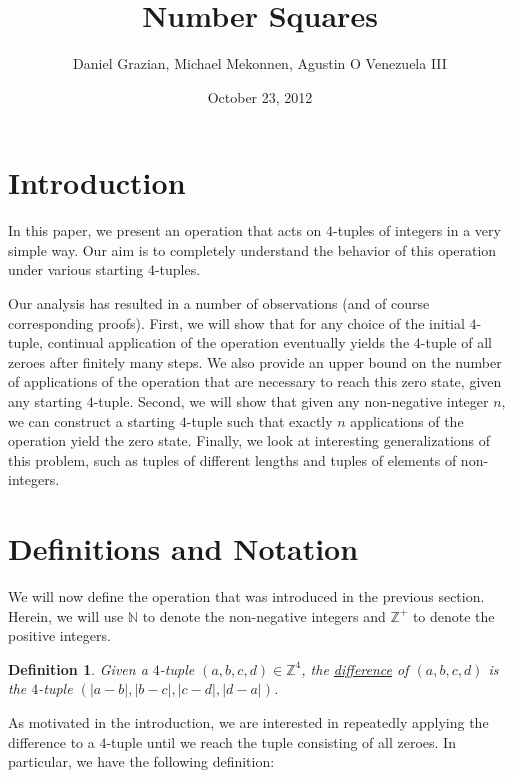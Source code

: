 \documentclass[12pt]{amsart}
\title{Number Squares}
\author{Daniel Grazian, Michael Mekonnen, Agustin O Venezuela III}
\date{October 23, 2012}
\newtheorem{definition}[theorem]{Definition}
\newcommand{\znn}{\mathbb{N}}
\newcommand{\zp}{\mathbb{Z}^+}
\begin{document}
\begin{abstract}
\end{abstract}

\maketitle

\section{Introduction\label{sec:intro}}

In this paper, we present an operation that acts on $4$-tuples of integers in a very simple way. Our aim is to completely understand the behavior of this operation under various starting $4$-tuples.

Our analysis has resulted in a number of observations (and of course corresponding proofs). First, we will show that for any choice of the initial $4$-tuple, continual application of the operation eventually yields the $4$-tuple of all zeroes after finitely many steps. We also provide an upper bound on the number of applications of the operation that are necessary to reach this zero state, given any starting $4$-tuple. Second, we will show that given any non-negative integer $n$, we can construct a starting $4$-tuple such that exactly $n$ applications of the operation yield the zero state. Finally, we look at interesting generalizations of this problem, such as tuples of different lengths and tuples of elements of non-integers.

\section{Definitions and Notation\label{sec:defs}}

We will now define the operation that was introduced in the previous section. Herein, we will use $\znn$ to denote the non-negative integers and $\zp$ to denote the positive integers.

\begin{definition}
Given a $4$-tuple $(a, b, c, d)\in \mathbb{Z}^4$, the \underline{difference} of $(a, b, c, d)$ is the $4$-tuple $(|a - b|, |b - c|, |c - d|, |d - a|)$.
\end{definition}

As motivated in the introduction, we are interested in repeatedly applying the difference to a $4$-tuple until we reach the tuple consisting of all zeroes. In particular, we have the following definition:
\end{document}
